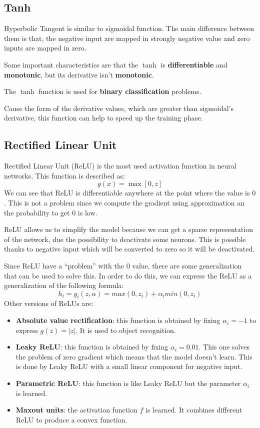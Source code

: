 \subsection{Tanh}
Hyperbolic Tangent is similar to sigmoidal function. The main difference between
them is that, the negative input are mapped in strongly negative value and zero
inputs are mapped in zero.

Some important characteristics are that the $\tanh$ is \textbf{differentiable}
and \textbf{monotonic}, but its derivative isn't \textbf{monotonic}.
\begin{note}
    The $\tanh$ function is used for \textbf{binary classification} problems.
\end{note}

Cause the form of the derivative values, which are greater than sigmoidal's derivative,
this function can help to speed up the training phase.
\subsection{Rectified Linear Unit}
Rectified Linear Unit (ReLU) is the most used activation function in neural networks.
This function is described as:
\begin{equation}
    g(x) = \max[0,z]
\end{equation}
We can see that ReLU is differentiable anywhere at the point where the value is
$0$. This is not a problem since we compute the gradient using approximation an
the probability to get $0$ is low.

ReLU allows us to simplify the model because we can get a sparse representation
of the network, due the possibility to deactivate some neurons. This is possible
thanks to negative input which will be converted to zero so it will be deactivated.

Since ReLU have a ``problem'' with the $0$ value, there are some generalization
that can be used to solve this. In order to do this, we can express the ReLU as
a generalization of the following formula:
\begin{equation}
    h_i = g_i(z,\alpha) = max(0,z_i) + \alpha_i min(0, z_i)
\end{equation}
Other versions of ReLUs are:
\begin{itemize}
    \item \textbf{Absolute value rectification}: this function is obtained by
          fixing $\alpha_i = -1$ to express $g(z) = |z|$. It is used to object
          recognition.
    \item \textbf{Leaky ReLU}: this function is obtained by fixing $\alpha_i = 0.01$.
          This one solves the problem of zero gradient which means that the model
          doesn't learn. This is done by Leaky ReLU with a small linear component
          for negative input.
    \item \textbf{Parametric ReLU}: this function is like Leaky ReLU but the
          parameter $\alpha_i$ is learned.
    \item \textbf{Maxout units}: the activation function $f$ is learned. It
          combines different ReLU to produce a convex function.
\end{itemize}
